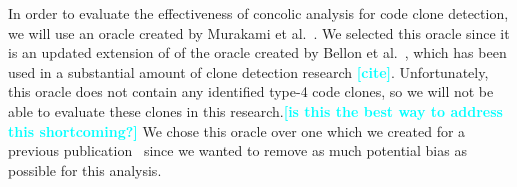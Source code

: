 \documentclass[smallextended]{svjour3}       %
\newcommand{\todo}[1]{\textcolor{cyan}{\textbf{[#1]}}}
\begin{document}


In order to evaluate the effectiveness of concolic analysis for code clone detection, we will use an oracle created by Murakami et al.~\cite{Murakami:2014:DCR:2597073.2597133}. We selected this oracle since it is an updated extension of of the oracle created by Bellon et al.~\cite{4288192}, which has been used in a substantial amount of clone detection research \todo{cite}. Unfortunately, this oracle does not contain any identified type-4 code clones, so we will not be able to evaluate these clones in this research.\todo{is this the best way to address this shortcoming?} We chose this oracle over one which we created for a previous publication~\cite{Krutz:2014:CCO:2597073.2597127} since we wanted to remove as much potential bias as possible for this analysis.




\cite{Falke:2008:EEC:1466711.1466713}



\end{document}
